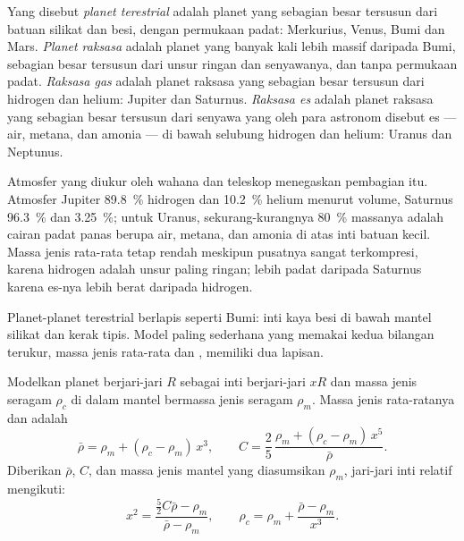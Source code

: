 \begin{definition}\label{def:b1:comparative-planetology:planet-types}
Yang disebut \emph{planet terestrial} adalah planet yang sebagian besar tersusun dari batuan silikat dan besi, dengan permukaan padat: Merkurius, Venus, Bumi dan Mars. \emph{Planet raksasa} adalah planet yang banyak kali lebih massif daripada Bumi, sebagian besar tersusun dari unsur ringan dan senyawanya, dan tanpa permukaan padat. \emph{Raksasa gas} adalah planet raksasa yang sebagian besar tersusun dari hidrogen dan helium: Jupiter dan Saturnus. \emph{Raksasa es} adalah planet raksasa yang sebagian besar tersusun dari senyawa yang oleh para astronom disebut es --- air, metana, dan amonia --- di bawah selubung hidrogen dan helium: Uranus dan Neptunus.
\end{definition}

Atmosfer yang diukur oleh wahana dan teleskop menegaskan pembagian itu. Atmosfer Jupiter \qty{89.8}{\percent} hidrogen dan \qty{10.2}{\percent} helium menurut volume, Saturnus \qty{96.3}{\percent} dan \qty{3.25}{\percent}; untuk Uranus, sekurang-kurangnya \qty{80}{\percent} massanya adalah cairan padat panas berupa air, metana, dan amonia di atas inti batuan kecil. Massa jenis rata-rata  tetap rendah meskipun pusatnya sangat terkompresi, karena hidrogen adalah unsur paling ringan;  lebih padat daripada Saturnus karena es-nya lebih berat daripada hidrogen.

Planet-planet terestrial berlapis seperti Bumi: inti kaya besi di bawah mantel silikat dan kerak tipis. Model paling sederhana yang memakai kedua bilangan terukur, massa jenis rata-rata dan , memiliki dua lapisan.

\begin{proposition}\label{prop:b1:comparative-planetology:two-layer}
Modelkan planet berjari-jari $R$ sebagai inti berjari-jari $xR$ dan massa jenis seragam $\rho_c$ di dalam mantel bermassa jenis seragam $\rho_m$. Massa jenis rata-ratanya dan  adalah
\[
  \bar\rho = \rho_m + (\rho_c - \rho_m)\,x^3 , \qquad
  C = \frac25\,\frac{\rho_m + (\rho_c - \rho_m)\,x^5}{\bar\rho} .
\]
Diberikan $\bar\rho$, $C$, dan massa jenis mantel yang diasumsikan $\rho_m$, jari-jari inti relatif mengikuti:
\[
  x^2 = \frac{\tfrac52C\bar\rho - \rho_m}{\bar\rho - \rho_m} ,
  \qquad \rho_c = \rho_m + \frac{\bar\rho - \rho_m}{x^3} .
\]
\end{proposition}

